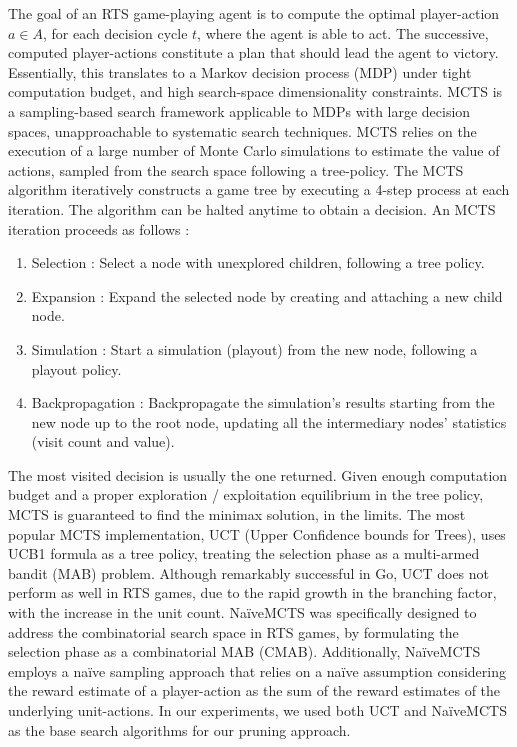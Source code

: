 \documentclass[conference]{IEEEtran}
\begin{document}
The goal of an RTS game-playing agent is to compute the optimal player-action $a \in A$, for each decision cycle $t$, where the agent is able to act. The successive, computed player-actions constitute a plan that should lead the agent to victory. Essentially, this translates to a Markov decision process (MDP) under tight computation budget, and high search-space dimensionality constraints. MCTS is a sampling-based search framework applicable to MDPs with large decision spaces, unapproachable to systematic search techniques. MCTS relies on the execution of a large number of Monte Carlo simulations to estimate the value of actions, sampled from the search space following a tree-policy. The MCTS algorithm iteratively constructs a game tree by executing a 4-step process at each iteration. The algorithm can be halted anytime to obtain a decision. An MCTS iteration proceeds as follows : 

\begin{enumerate}
\item Selection : Select a node with unexplored children, following a tree policy.
\item Expansion : Expand the selected node by creating and attaching a new child node.
\item Simulation : Start a simulation (playout) from the new node, following a playout policy.
\item Backpropagation : Backpropagate the simulation's results starting from the new node up to the root node, updating all the intermediary nodes' statistics (visit count and value).
\end{enumerate}

The most visited decision is usually the one returned. Given enough computation budget and a proper exploration / exploitation equilibrium in the tree policy, MCTS is guaranteed to find the minimax solution, in the limits. The most popular MCTS implementation, UCT (Upper Confidence bounds for Trees), uses UCB1 formula as a tree policy, treating the selection phase as a multi-armed bandit (MAB) problem. Although remarkably successful in Go, UCT does not perform as well in RTS games, due to the rapid growth in the branching factor, with the increase in the unit count. NaïveMCTS was specifically designed to address the combinatorial search space in RTS games, by formulating the selection phase as a combinatorial MAB (CMAB). Additionally, NaïveMCTS employs a naïve sampling approach that relies on a naïve assumption considering the reward estimate of a player-action as the sum of the reward estimates of the underlying unit-actions. In our experiments, we used both UCT and NaïveMCTS as the base search algorithms for our pruning approach.
\end{document}
